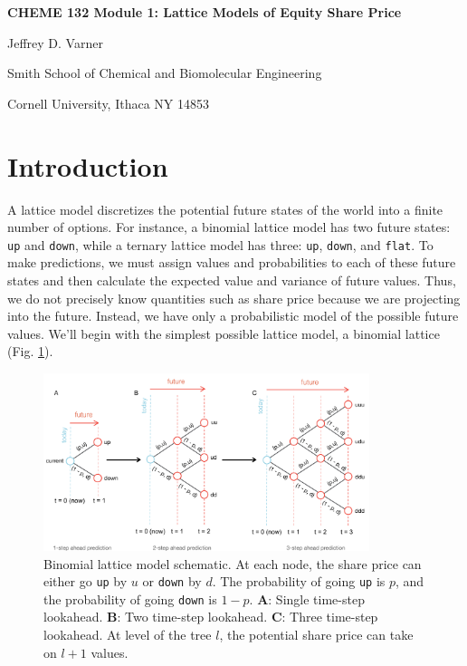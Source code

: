 \documentclass[11pt]{article}
\theoremstyle{definition}
\begin{document}
{\par\centering\textbf{\Large CHEME 132 Module 1: Lattice Models of Equity Share Price}}
\vspace{0.2in}
{\par \centering \large{Jeffrey D. Varner}}
\vspace{0.05in}
{\par \centering \large{Smith School of Chemical and Biomolecular Engineering}}
{\par \centering \large{Cornell University, Ithaca NY 14853}}

\date{}
\thispagestyle{empty}

\setcounter{page}{1}

\section*{Introduction}
A lattice model discretizes the potential future states of the world into a finite number of options. 
For instance, a binomial lattice model has two future states: \texttt{up} and \texttt{down}, while a ternary lattice model has three: \texttt{up}, \texttt{down}, and \texttt{flat}. 
To make predictions, we must assign values and probabilities to each of these future states and then calculate the expected value and variance of future values. 
Thus, we do not precisely know quantities such as share price because we are projecting into the future. Instead, we have only a probabilistic model of the possible future values. 
We'll begin with the simplest possible lattice model, a binomial lattice (Fig. \ref{fig:binomial-lattice-schematic}).
\begin{figure}[h]
    \centering
    \includegraphics[width=0.85\textwidth]{./figs/Fig-Binomial-LatticeModels-Schematic.pdf}
    \caption{Binomial lattice model schematic. 
	At each node, the share price can either go \texttt{up} by $u$ or \texttt{down} by $d$. 
	The probability of going \texttt{up} is $p$, and the probability of going \texttt{down} is $1-p$. 
	\textbf{A}: Single time-step lookahead.
	\textbf{B}: Two time-step lookahead.
	\textbf{C}: Three time-step lookahead.
	At level of the tree $l$, the potential share price can take on $l+1$ values.
	}\label{fig:binomial-lattice-schematic}
\end{figure}
\end{document}
